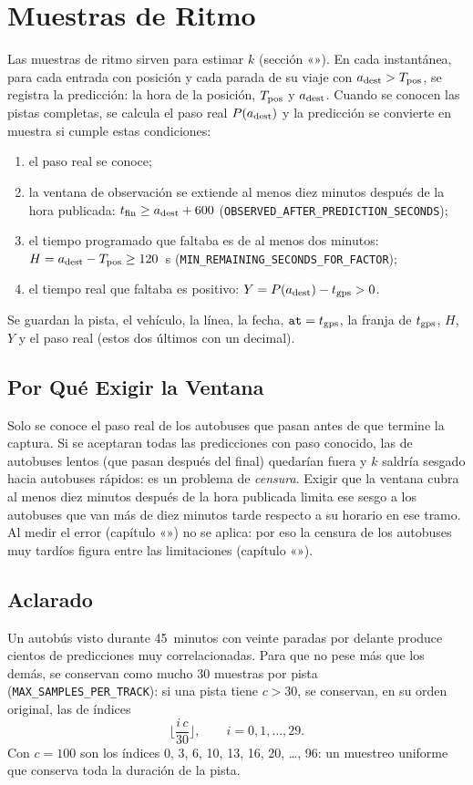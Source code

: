 \section{Muestras de Ritmo}
\label{sec:muestras-ritmo}

Las muestras de ritmo sirven para estimar $k$ (sección «»). En cada instantánea, para cada entrada con
posición y cada parada de su viaje con $a_{\mathrm{dest}}>T_{\mathrm{pos}}$, se registra la predicción: la hora de la posición, $T_{\mathrm{pos}}$ y
$a_{\mathrm{dest}}$. Cuando se conocen las pistas completas, se calcula el paso real $P(a_{\mathrm{dest}})$ y la predicción se convierte en
muestra si cumple estas condiciones:
\begin{enumerate}
  \item el paso real se conoce;
  \item la ventana de observación se extiende al menos diez minutos después de la hora publicada:
        $t_{\mathrm{fin}}\ge a_{\mathrm{dest}}+600$ (\texttt{OBSERVED\_AFTER\_PREDICTION\_SECONDS});
  \item el tiempo programado que faltaba es de al menos dos minutos: $H=a_{\mathrm{dest}}-T_{\mathrm{pos}}\ge120$~s
        (\texttt{MIN\_REMAINING\_SECONDS\_FOR\_FACTOR});
  \item el tiempo real que faltaba es positivo: $Y=P(a_{\mathrm{dest}})-t_{\mathrm{gps}}>0$.
\end{enumerate}
Se guardan la pista, el vehículo, la línea, la fecha, $\texttt{at}=t_{\mathrm{gps}}$, la franja de $t_{\mathrm{gps}}$, $H$, $Y$ y el paso
real (estos dos últimos con un decimal).

\subsection{Por Qué Exigir la Ventana} Solo se conoce el paso real de los autobuses que pasan antes de que termine la
captura. Si se aceptaran todas las predicciones con paso conocido, las de autobuses lentos (que pasan después del
final) quedarían fuera y $k$ saldría sesgado hacia autobuses rápidos: es un problema de \emph{censura}. Exigir que la
ventana cubra al menos diez minutos después de la hora publicada limita ese sesgo a los autobuses que van más de diez
minutos tarde respecto a su horario en ese tramo. Al medir el error (capítulo «») no se aplica: por
eso la censura de los autobuses muy tardíos figura entre las limitaciones (capítulo «»).

\subsection{Aclarado} Un autobús visto durante 45~minutos con veinte paradas por delante produce cientos de
predicciones muy correlacionadas. Para que no pese más que los demás, se conservan como mucho 30 muestras por pista
(\texttt{MAX\_SAMPLES\_PER\_TRACK}): si una pista tiene $c>30$, se conservan, en su orden original, las de
índices
\begin{equation}
\label{eq:aclarado}
\Big\lfloor\frac{i\,c}{30}\Big\rfloor,\qquad i=0,1,\dots,29 .
\end{equation}
Con $c=100$ son los índices 0, 3, 6, 10, 13, 16, 20, \dots, 96: un muestreo uniforme que conserva toda la duración de
la pista.

